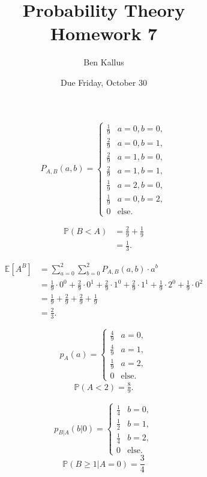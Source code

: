 \documentclass[12pt]{article}
\title{Probability Theory \\ Homework 7}
\author{Ben Kallus}
\date{Due Friday, October 30}
\begin{document}
\pagecolor{black}
\color{white}
\maketitle

 $$P_{A,B}(a,b) =
\begin{cases}
    \frac19 & a = 0, b = 0, \\
    \frac29 & a = 0, b = 1, \\
    \frac29 & a = 1, b = 0, \\
    \frac29 & a = 1, b = 1, \\
    \frac19 & a = 2, b = 0, \\
    \frac19 & a = 0, b = 2, \\
    0 & \text{else.}
\end{cases}$$

\medskip
{}
\begin{align*}
    \mathbb P(B < A) &=\frac29 + \frac19 \\
                     &= \frac13.
\end{align*}

\medskip
{}
\begin{align*}
    \mathbb E[A^B] &= \sum_{a=0}^2 \sum_{b=0}^2 P_{A,B}(a,b) \cdot a^b \\
                   &= \frac19 \cdot 0^0 + \frac29 \cdot 0^1 + \frac29 \cdot 1^0 + \frac29 \cdot 1^1 + \frac19 \cdot 2^0 + \frac19 \cdot 0^2\\
                   &= \frac19 + \frac29 + \frac29 + \frac19 \\
                   &= \frac23.
\end{align*}

\medskip
{} \[p_A(a) = \begin{cases} \frac49 & a = 0, \\
                                           \frac49 & a = 1, \\
                                           \frac19 & a = 2, \\
                                           0 & \text{else.} \end{cases}\]
\begin{align*}
    \mathbb P(A < 2) = \frac89.
\end{align*}

\medskip
{} $$p_{B|A}(b|0) = \begin{cases} \frac14 & b = 0, \\ \frac12 & b = 1, \\ \frac14 & b = 2, \\ 0 & \text{else.} \end{cases}$$
$$\mathbb P(B \geq 1|A=0) = \frac34$$
\end{document}
